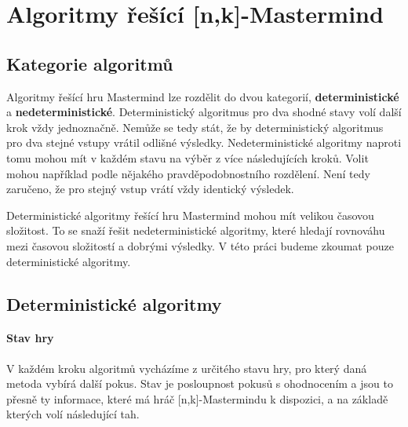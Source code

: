 \chapter{Algoritmy řešící [n,k]-Mastermind}

\section{Kategorie algoritmů}
Algoritmy řešící hru Mastermind lze rozdělit do dvou kategorií, \textbf{deterministické} a \textbf{nedeterministické}. Deterministický algoritmus pro dva shodné stavy volí další krok vždy jednoznačně. Nemůže se tedy stát, že by deterministický algoritmus pro dva stejné vstupy vrátil odlišné výsledky. Nedeterministické algoritmy naproti tomu mohou mít v každém stavu na výběr z více následujících kroků. Volit mohou například podle nějakého pravděpodobnostního rozdělení. Není tedy zaručeno, že pro stejný vstup vrátí vždy identický výsledek.

Deterministické algoritmy řešící hru Mastermind mohou mít velikou časovou složitost. To se snaží řešit nedeterministické algoritmy, které hledají rovnováhu mezi časovou složitostí a dobrými výsledky. 
V této práci budeme zkoumat pouze deterministické algoritmy. 



\section{Deterministické algoritmy}

\subsubsection{Stav hry}
V každém kroku algoritmů vycházíme z určitého stavu hry, pro který daná metoda vybírá další pokus. Stav je posloupnost pokusů s ohodnocením a jsou to přesně ty informace, které má hráč [n,k]-Mastermindu k dispozici, a na základě kterých volí následující tah.

